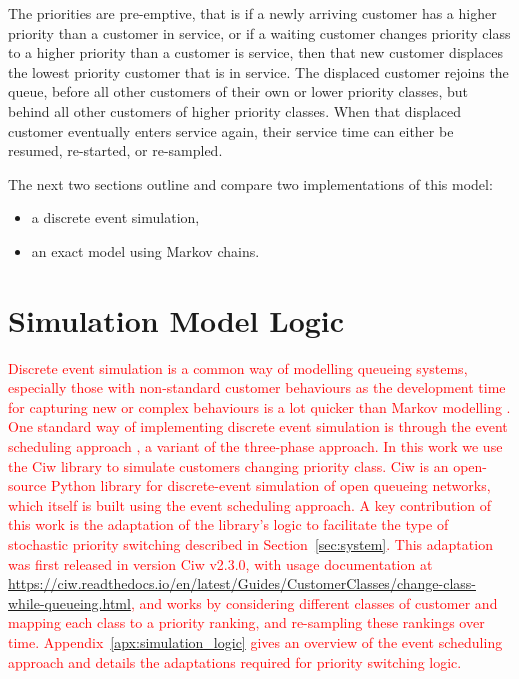 \documentclass{article}
\begin{document}
The priorities are pre-emptive, that is if a newly arriving customer has a
higher priority than a customer in service, or if a waiting customer changes
priority class to a higher priority than a customer is service, then that new
customer displaces the lowest priority customer that is in service.
The displaced customer rejoins the queue, before all other customers of their
own or lower priority classes, but behind all other customers of higher priority
classes.
When that displaced customer eventually enters service again, their service time
can either be resumed, re-started, or re-sampled.

The next two sections outline and compare two implementations of this model:

\begin{itemize}
    \item a discrete event simulation,
    \item an exact model using Markov chains.
\end{itemize}



\section{Simulation Model Logic}\label{sec:simulation}
\textcolor{red}{Discrete event simulation is a common way of modelling queueing
systems, especially those with non-standard customer behaviours as the
development time for capturing new or complex behaviours is a lot quicker than
Markov modelling \cite{standfield14}. 
One standard way of implementing discrete event simulation is through the event
scheduling approach \cite{robinson14}, a variant of the three-phase approach.
In this work we use the Ciw library \cite{palmer19} to simulate customers
changing priority class.
Ciw is an open-source Python library for discrete-event simulation of open
queueing networks, which itself is built using the event scheduling approach.
A key contribution of this work is the adaptation of the library's logic to
facilitate the type of stochastic priority switching described in
Section~\ref{sec:system}.
This adaptation was first released in version Ciw v2.3.0, with usage
documentation at \url{https://ciw.readthedocs.io/en/latest/Guides/CustomerClasses/change-class-while-queueing.html},
and works by considering different classes of customer and mapping each class to
a priority ranking, and re-sampling these rankings over time.
Appendix~\ref{apx:simulation_logic} gives an overview of the event scheduling
approach and details the adaptations required for priority switching logic.}
\end{document}
